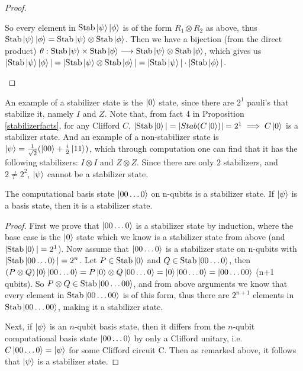 \documentclass[12pt]{dalthesis}
\begin{document}
\begin{proof}
\begin{enumerate}
 So every element in $\text{Stab}\ket{\psi}\ket{\phi}$ is of the form $R_1 \otimes R_2$ as above, thus $\text{Stab}\ket{\psi}\ket{\phi} = \text{Stab}\ket{\psi} \otimes \text{Stab}\ket{\phi}$. Then we have a bijection (from the direct product) $\theta:\text{Stab}\ket{\psi} \times \text{Stab}\ket{\phi} \longrightarrow  \text{Stab}\ket{\psi} \otimes \text{Stab}\ket{\phi}$, which gives us $|\text{Stab}\ket{\psi}\ket{\phi}| = |\text{Stab}\ket{\psi} \otimes \text{Stab}\ket{\phi}| = |\text{Stab}\ket{\psi}| \cdot |\text{Stab}\ket{\phi}|$.
\end{enumerate}
\end{proof}



An example of a stabilizer state is the $\ket{0}$ state, since there are $2^1$ pauli's that stabilize it, namely $I$ and $Z$. Note that, from fact 4 in Proposition \ref{stabilizerfacts}, for any Clifford $C$, $|\text{Stab}\ket{0}| = |Stab(C\ket{0})| = 2^1 \implies C\ket{0}$ is a stabilizer state. And an example of a non-stabilizer state is $\ket{\psi} = \frac{1}{\sqrt{2}}(\ket{00} + \frac{i}{2} \ket{11})$, which through computation one can find that it has the following stabilizers: $I \otimes I$ and $Z \otimes Z$. Since there are only $2$ stabilizers, and $2 \neq 2^2$, $\ket{\psi}$ cannot be a stabilizer state.

\begin{corollary}
The computational basis state $\ket{00 \dots 0}$ on n-qubits is a stabilizer state. If $\ket{\psi}$ is a basis state, then it is a stabilizer state. 
\end{corollary}
\begin{proof}
First we prove that $\ket{00 \dots 0}$ is a stabilizer state by induction, where the base case is the $\ket{0}$ state which we know is a stabilizer state from above (and $|\text{Stab}\ket{0}| = 2^1$). Now assume that $\ket{00 \dots 0}$ is a stabilizer state on n-qubits with $|\text{Stab}\ket{00 \dots 0}| = 2^n$. Let $P \in \text{Stab}\ket{0}$ and $Q \in \text{Stab}\ket{00 \dots 0}$, then $(P \otimes Q)\ket{0}\ket{00 \dots 0} = P\ket{0} \otimes Q\ket{00 \dots 0} = \ket{0}\ket{00 \dots 0} = \ket{00 \dots 00}$ (n+1 qubits). So $P \otimes Q \in \text{Stab}\ket{00 \dots 00}$, and from above arguments we know that every element in $\text{Stab}\ket{00 \dots 00}$ is of this form, thus there are $2^{n+1}$ elements in $\text{Stab}\ket{00 \dots 00}$, making it a stabilizer state.


Next, if $\ket{\psi}$ is an $n$-qubit basis state, then it differs from the $n$-qubit computational basis state $\ket{00 \ldots 0}$ by only a Clifford unitary, i.e. $C\ket{00 \ldots 0} = \ket{\psi}$ for some Clifford circuit C. Then as remarked above, it follows that $\ket{\psi}$ is a stabilizer state.
\end{proof}
\end{document}
